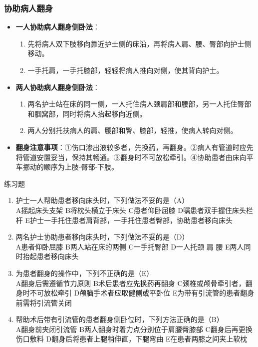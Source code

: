 \documentclass[11pt, a4paper]{ctexart}
\begin{document}
\subsubsection{协助病人翻身}
\begin{itemize}
    \item \textbf{一人协助病人翻身侧卧法}：
    \begin{enumerate}
        \item 先将病人双下肢移向靠近护士侧的床沿，再将病人肩、腰、臀部向护士侧移动。
        \item 一手托肩，一手托膝部，轻轻将病人推向对侧，使其背向护士。
    \end{enumerate}
    \item \textbf{两人协助病人翻身侧卧法}：
    \begin{enumerate}
        \item 两名护士站在床的同一侧，一人托住病人颈肩部和腰部，另一人托住臀部和腘窝部，同时将病人抬起移向近侧。
        \item 两人分别托扶病人的肩、腰部和臀、膝部，轻推，使病人转向对侧。
    \end{enumerate}
    \item \textbf{翻身注意事项}：①伤口渗出液较多者，先换药，再翻身。②病人有管道时应先将管道安置妥当，保持其畅通。③翻身时不可放松牵引。④协助患者由床向平车挪动的顺序为上肢-臀部-下肢。
\end{itemize}

\begin{examplebox}{练习题}
\begin{enumerate}
    \item 护士一人帮助患者移向床头时，下列做法不妥的是（A）\\
    A摇起床头支架 \quad B将枕头横立于床头 \quad C患者仰卧屈膝 \quad D嘱患者双手握住床头栏杆 \quad E护士一手托住患者肩背部，一手托住患者臀部，协助患者移向床头
    \item 两名护士协助患者移向床头时，下列做法不妥的是（D）\\
    A患者仰卧屈膝 \quad B两人站在床的两侧 \quad C一手托臀部 \quad D一人托颈 肩 腰 \quad E两人同时抬起患者移向床头
    \item 为患者翻身的操作中，下列不正确的是（E）\\
    A翻身后需遵循节力原则 \quad B术后患者应先换药再翻身 \quad C颈椎或颅骨牵引者，翻身时不可放松牵引 \quad D颅脑手术者应取健侧或平卧位 \quad E为带有引流管的患者翻身前需将引流管关闭
    \item 帮助术后带有引流管的患者翻身侧卧位时，下列方法正确的是（B）\\
    A翻身前夹闭引流管 \quad B两人翻身时着力点分别位于肩腰臀膝部 \quad C翻身后再更换伤口敷料 \quad D翻身后将患者上腿稍伸直，下腿弯曲 \quad E在患者两膝之间夹上软枕
\end{enumerate}
\end{examplebox}
\end{document}
